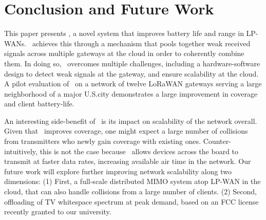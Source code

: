 \section{Conclusion and Future Work}
\label{sec:conclusion}


This paper presents \name, a novel system that improves battery life and range in LP-WANs. \name\ achieves this through a mechanism that pools together weak received signals across multiple gateways at the cloud in order to coherently combine them. In doing so, \name\ overcomes multiple challenges, including a hardware-software design to detect weak signals at the gateway, and ensure scalability at the cloud. A pilot evaluation of \name\ on a network of twelve LoRaWAN gateways serving a large neighborhood of a major U.S.city demonstrates a large improvement in coverage and client battery-life.

An interesting side-benefit of \name\ is its impact on scalability of the network overall. Given that \name\ improves coverage, one might expect a large number of collisions from transmitters who newly gain coverage with existing ones. Counter-intuitively, this is not the case because \name\ allows devices across the board to transmit at faster data rates, increasing available air time in the network. Our future work will explore further improving network scalability along two dimensions: (1) First, a full-scale distributed MIMO system atop LP-WAN in the cloud, that can also handle collisions from a large number of clients. (2) Second, offloading of TV whitespace spectrum at peak demand, based on an FCC license recently granted to our university.  



